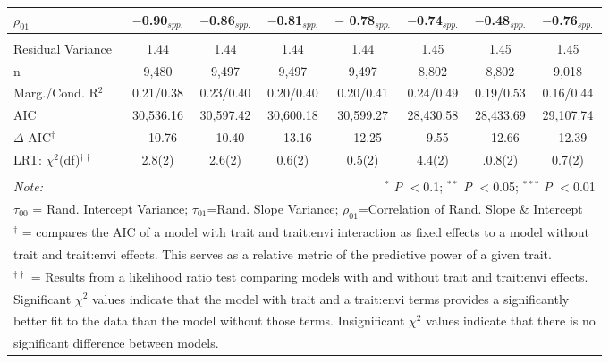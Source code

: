 \documentclass[12pt, letterpaper]{article}
\begin{document}
\begin{table}[h]
{\begin{tabular}{lccccccc}
 $\rho_{01}$ & $-$0.90$_{spp.}$ & $-$0.86$_{spp.}$ & $-$0.81$_{spp.}$ & $-$ 0.78$_{spp.}$ & $-$0.74$_{spp.}$ & $-$0.48$_{spp.}$ & $-$0.76$_{spp.}$ \\
\hline \\[-1.8ex] 
\rowcolor[gray]{.95} Residual Variance & 1.44 & 1.44 & 1.44 & 1.44 & 1.45 & 1.45 & 1.45 \\
n & 9,480 & 9,497 & 9,497 & 9,497 & 8,802 & 8,802 & 9,018 \\ 
\rowcolor[gray]{.95} Marg./Cond. R$^2$ & 0.21/0.38 & 0.23/0.40	& 0.20/0.40 & 0.20/0.41	& 0.24/0.49 & 0.19/0.53 & 0.16/0.44\\
AIC & 30,536.16 & 30,597.42 & 30,600.18 & 30,599.27 & 28,430.58 & 28,433.69 & 29,107.74 \\ 
\hline 
\rowcolor[gray]{.95}$\Delta$ AIC$^\dagger$ & $-$10.76 & $-$10.40 & $-$13.16 & $-$12.25 & $-$9.55 & $-$12.66 & $-$12.39 \\
LRT:  $\chi^2$(df)$^{\dagger\dagger}$ &
2.8(2) & 2.6(2) & 0.6(2) & 0.5(2) & 4.4(2) & .0.8(2) & 0.7(2)\\
\hline 
\hline \\[-1.8ex] 
\textit{Note:} & \multicolumn{7}{r}{$^{*}$ \textit{P} $<$0.1; $^{**}$ \textit{P} $<$0.05; $^{***}$ \textit{P} $<$0.01}\\
\multicolumn{8}{l}{$\tau_{00}$ = Rand. Intercept Variance; $\tau_{01}$=Rand. Slope Variance; $\rho_{01}$=Correlation of Rand. Slope \& Intercept}\\
\multicolumn{8}{l}{$^\dagger$ = compares the AIC of a model with trait and trait:envi interaction as fixed effects to a model without}\\
\multicolumn{8}{l}{trait and trait:envi effects. This serves as a relative metric of the predictive power of a given trait.}\\
\multicolumn{8}{l}{$^{\dagger\dagger}$ = Results from a likelihood ratio test comparing models with and without trait and trait:envi effects.}\\
\multicolumn{8}{l}{Significant $\chi^2$ values indicate that the model with trait and a trait:envi terms provides a significantly }\\
\multicolumn{8}{l}{better fit to the data than the model without those terms. Insignificant $\chi^2$ values indicate that there is no}\\
\multicolumn{8}{l}{significant difference between models.}
\end{tabular}} 
\end{table} 
\end{document}
